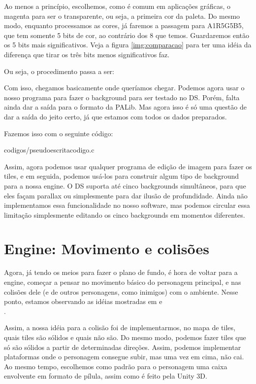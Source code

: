 \documentclass[brazil]{abnt}
\begin{document}
Ao menos a princípio, escolhemos, como é comum em aplicações gráficas, o magenta para ser o transparente, ou seja, a primeira cor da paleta. Do mesmo modo, enquanto processamos as cores, já faremos a passagem para A1R5G5B5, que tem somente 5 bits de cor, ao contrário dos 8 que temos. Guardaremos então os 5 bits mais significativos. Veja a figura \ref{img:comparacao} para ter uma idéia da diferença que tirar os três bits menos significativos faz.

Ou seja, o procedimento passa a ser:



Com isso, chegamos basicamente onde queríamos chegar. Podemos agora usar o nosso programa para fazer o background para ser testado no DS. Porém, falta ainda dar a saída para o formato da PALib. Mas agora isso é só uma questão de dar a saída do jeito certo, já que estamos com todos os dados preparados.

Fazemos isso com o seguinte código:


{codigos/pseudoescritacodigo.c}

Assim, agora podemos usar qualquer programa de edição de imagem para fazer os tiles, e em seguida, podemos usá-los para construir algum tipo de background para a nossa engine. O DS suporta até cinco backgrounds simultâneos, para que eles façam parallax ou simplesmente para dar ilusão de profundidade. Ainda não implementamos essa funcionalidade no nosso software, mas podemos circular essa limitação simplesmente editando os cinco backgrounds em momentos diferentes.

\section{Engine: Movimento e colisões}

Agora, já tendo os meios para fazer o plano de fundo, é hora de voltar para a engine, começar a pensar no movimento básico do personagem principal, e nas colisões dele (e de outros personagens, como inimigos) com o ambiente. Nesse ponto, estamos observando as idéias mostradas em \cite[N Tutorial A]{NCollisionA} e \\\cite[N Tutorial B]{NCollisionB}.

Assim, a nossa idéia para a colisão foi de implementarmos, no mapa de tiles, quais tiles são sólidos e quais não são. Do mesmo modo, podemos fazer tiles que só são sólidos a partir de determinadas direções. Assim, podemos implementar plataformas onde o personagem consegue subir, mas uma vez em cima, não cai. Ao mesmo tempo, escolhemos como padrão para o personagem uma caixa envolvente em formato de pílula, assim como é feito pela Unity 3D.\footnotemark
\end{document}
